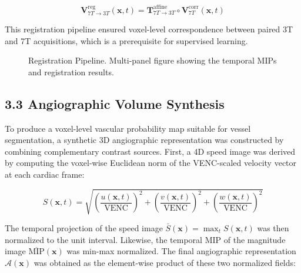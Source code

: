 \begin{equation}
    \mathbf{V}_{7T \to 3T}^{\text{reg}}(\mathbf{x}, t) = \mathbf{T}^{\text{affine}}_{7T \to 3T} \circ \mathbf{V}_{7T}^{\text{corr}}(\mathbf{x}, t)
\end{equation}

This registration pipeline ensured voxel-level correspondence between paired 3T and 7T acquisitions, which is a prerequisite for supervised learning.

\begin{figure}[h]
    \centering
    \caption{Registration Pipeline. Multi-panel figure showing the temporal MIPs and registration results.}
    \label{fig:registration}
\end{figure}

\subsection*{3.3 Angiographic Volume Synthesis}

To produce a voxel-level vascular probability map suitable for vessel segmentation, a synthetic 3D angiographic representation was constructed by combining complementary contrast sources. First, a 4D speed image was derived by computing the voxel-wise Euclidean norm of the VENC-scaled velocity vector at each cardiac frame:

\begin{equation}
    S(\mathbf{x}, t) = \sqrt{
        \left(\frac{u(\mathbf{x},t)}{\text{VENC}}\right)^2 +
        \left(\frac{v(\mathbf{x},t)}{\text{VENC}}\right)^2 +
        \left(\frac{w(\mathbf{x},t)}{\text{VENC}}\right)^2
    }
\end{equation}

The temporal projection of the speed image $\bar{S}(\mathbf{x}) = \max_t S(\mathbf{x}, t)$ was then normalized to the unit interval. Likewise, the temporal MIP of the magnitude image $\overline{\text{MIP}}(\mathbf{x})$ was min-max normalized. The final angiographic representation $\mathcal{A}(\mathbf{x})$ was obtained as the element-wise product of these two normalized fields:

